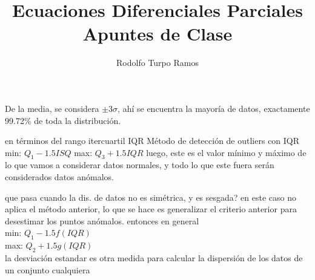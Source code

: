 \documentclass{article}
\title{Ecuaciones Diferenciales Parciales\\Apuntes de Clase}
\author{Rodolfo Turpo Ramos}
\date{\Today}
\begin{document}
De la media, se considera $\pm 3\sigma$, ahí se encuentra la mayoría de datos, exactamente 99.72\% de toda la distribución.

en términos del rango itercuartil IQR
Método de detección de outliers con IQR
min: $Q_1-1.5ISQ$
max: $Q_3+1.5IQR$
luego, este es el valor mínimo y máximo de lo que vamos a considerar datos normales, y todo lo que este fuera serán considerados datos anómalos.

que pasa cuando la dis. de datos no es simétrica, y es sesgada?
en este caso no aplica el método anterior, lo que se hace es generalizar el criterio anterior para desestimar los puntos anómalos. entonces en general\\
min: $Q_1-1.5f(IQR)$\\
max: $Q_2+1.5g(IQR)$\\
la desviación estandar es otra medida para calcular la dispersión de los datos de un conjunto cualquiera
\end{document}
